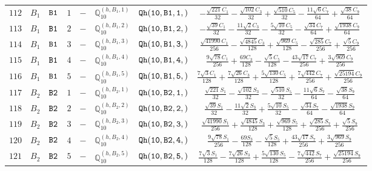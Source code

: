 \documentclass[fleqn,8pt]{jsarticle}
\begin{document}
\begin{table}[ht!]
\begin{center}
\begin{tabular}{cccccccc}
$ 112 $ & $ B_{1} $ & $ {\tt B1} $ & $ 1 $ & $ - $ & $ \mathbb{Q}_{10}^{(h,B_{1},1)} $ & $ {\tt Qh(10,B1,1,)} $ & $ - \frac{\sqrt{221} C_{1}}{32} - \frac{\sqrt{102} C_{3}}{32} + \frac{\sqrt{510} C_{5}}{32} - \frac{11 \sqrt{6} C_{7}}{64} + \frac{\sqrt{38} C_{9}}{64} $ \\
$ 113 $ & $ B_{1} $ & $ {\tt B1} $ & $ 2 $ & $ - $ & $ \mathbb{Q}_{10}^{(h,B_{1},2)} $ & $ {\tt Qh(10,B1,2,)} $ & $ - \frac{\sqrt{39} C_{1}}{32} - \frac{11 \sqrt{2} C_{3}}{32} - \frac{5 \sqrt{10} C_{5}}{32} - \frac{\sqrt{34} C_{7}}{64} + \frac{\sqrt{1938} C_{9}}{64} $ \\
$ 114 $ & $ B_{1} $ & $ {\tt B1} $ & $ 3 $ & $ - $ & $ \mathbb{Q}_{10}^{(h,B_{1},3)} $ & $ {\tt Qh(10,B1,3,)} $ & $ \frac{\sqrt{41990} C_{1}}{256} - \frac{\sqrt{4845} C_{3}}{128} + \frac{\sqrt{969} C_{5}}{128} - \frac{\sqrt{285} C_{7}}{256} + \frac{\sqrt{5} C_{9}}{256} $ \\
$ 115 $ & $ B_{1} $ & $ {\tt B1} $ & $ 4 $ & $ - $ & $ \mathbb{Q}_{10}^{(h,B_{1},4)} $ & $ {\tt Qh(10,B1,4,)} $ & $ \frac{9 \sqrt{78} C_{1}}{256} + \frac{69 C_{3}}{128} - \frac{\sqrt{5} C_{5}}{128} - \frac{43 \sqrt{17} C_{7}}{256} + \frac{3 \sqrt{969} C_{9}}{256} $ \\
$ 116 $ & $ B_{1} $ & $ {\tt B1} $ & $ 5 $ & $ - $ & $ \mathbb{Q}_{10}^{(h,B_{1},5)} $ & $ {\tt Qh(10,B1,5,)} $ & $ \frac{7 \sqrt{3} C_{1}}{128} + \frac{7 \sqrt{26} C_{3}}{128} + \frac{5 \sqrt{130} C_{5}}{128} + \frac{7 \sqrt{442} C_{7}}{256} + \frac{\sqrt{25194} C_{9}}{256} $ \\
$ 117 $ & $ B_{2} $ & $ {\tt B2} $ & $ 1 $ & $ - $ & $ \mathbb{Q}_{10}^{(h,B_{2},1)} $ & $ {\tt Qh(10,B2,1,)} $ & $ \frac{\sqrt{221} S_{1}}{32} - \frac{\sqrt{102} S_{3}}{32} - \frac{\sqrt{510} S_{5}}{32} - \frac{11 \sqrt{6} S_{7}}{64} - \frac{\sqrt{38} S_{9}}{64} $ \\
$ 118 $ & $ B_{2} $ & $ {\tt B2} $ & $ 2 $ & $ - $ & $ \mathbb{Q}_{10}^{(h,B_{2},2)} $ & $ {\tt Qh(10,B2,2,)} $ & $ \frac{\sqrt{39} S_{1}}{32} - \frac{11 \sqrt{2} S_{3}}{32} + \frac{5 \sqrt{10} S_{5}}{32} - \frac{\sqrt{34} S_{7}}{64} - \frac{\sqrt{1938} S_{9}}{64} $ \\
$ 119 $ & $ B_{2} $ & $ {\tt B2} $ & $ 3 $ & $ - $ & $ \mathbb{Q}_{10}^{(h,B_{2},3)} $ & $ {\tt Qh(10,B2,3,)} $ & $ \frac{\sqrt{41990} S_{1}}{256} + \frac{\sqrt{4845} S_{3}}{128} + \frac{\sqrt{969} S_{5}}{128} + \frac{\sqrt{285} S_{7}}{256} + \frac{\sqrt{5} S_{9}}{256} $ \\
$ 120 $ & $ B_{2} $ & $ {\tt B2} $ & $ 4 $ & $ - $ & $ \mathbb{Q}_{10}^{(h,B_{2},4)} $ & $ {\tt Qh(10,B2,4,)} $ & $ \frac{9 \sqrt{78} S_{1}}{256} - \frac{69 S_{3}}{128} - \frac{\sqrt{5} S_{5}}{128} + \frac{43 \sqrt{17} S_{7}}{256} + \frac{3 \sqrt{969} S_{9}}{256} $ \\
$ 121 $ & $ B_{2} $ & $ {\tt B2} $ & $ 5 $ & $ - $ & $ \mathbb{Q}_{10}^{(h,B_{2},5)} $ & $ {\tt Qh(10,B2,5,)} $ & $ \frac{7 \sqrt{3} S_{1}}{128} - \frac{7 \sqrt{26} S_{3}}{128} + \frac{5 \sqrt{130} S_{5}}{128} - \frac{7 \sqrt{442} S_{7}}{256} + \frac{\sqrt{25194} S_{9}}{256} $ \\
 \hline \hline
\end{tabular}
\end{center}
\end{table}
\end{document}
